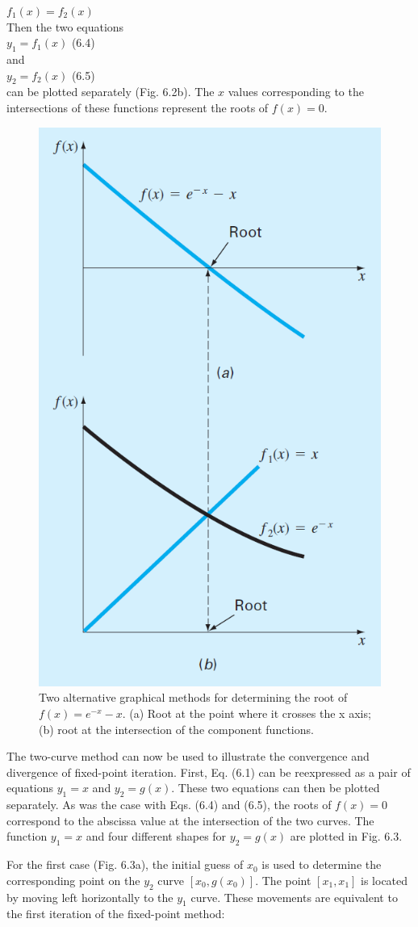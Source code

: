 \documentclass[../main.tex]{subfiles}
\begin{document}
$f_1(x)=f_2(x)$\\

\noindent Then the two equations\\

$y_1 = f_1(x)$
\hfill (6.4)\\

\noindent and\\

$y_2=f_2(x)$
\hfill (6.5)\\

\noindent can be plotted separately (Fig. 6.2b). The $x$ values corresponding to the intersections of
these functions represent the roots of $f (x) = 0$.

\begin{figure}[h]
    \includegraphics[width=0.4\linewidth]{./images/fig_6_2}
    \caption{Two alternative graphical methods for determining the root of $f (x) = e^{-x} - x$. (a) Root at the
    point where it crosses the x axis; (b) root at the intersection of the component functions.}
\end{figure}

The two-curve method can now be used to illustrate the convergence and divergence
of fixed-point iteration. First, Eq. (6.1) can be reexpressed as a pair of equations $y_1 = x$
and $y_2 = g(x)$. These two equations can then be plotted separately. As was the case with
Eqs. (6.4) and (6.5), the roots of $f (x) = 0$ correspond to the abscissa value at the intersection
of the two curves. The function $y_1 = x$ and four different shapes for $y_2 = g(x)$ are
plotted in Fig. 6.3.

For the first case (Fig. 6.3a), the initial guess of $x_0$ is used to determine the corresponding
point on the $y_2$ curve $[x_0, g(x_0)]$. The point $[x_1, x_1]$ is located by moving left horizontally to
the $y_1$ curve. These movements are equivalent to the first iteration of the fixed-point method:\\
\end{document}

